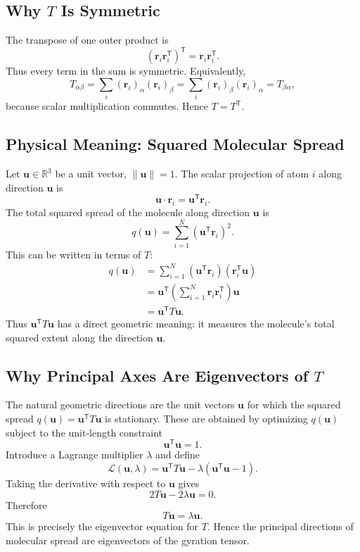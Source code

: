 \documentclass[11pt]{article}
\newcommand{\R}{\mathbb{R}}
\newcommand{\T}{\mathsf{T}}
\begin{document}
\subsection{Why \(T\) Is Symmetric}

The transpose of one outer product is
\[
    \left(\mathbf r_i\mathbf r_i^{\T}\right)^{\T}
    =
    \mathbf r_i\mathbf r_i^{\T}.
\]
Thus every term in the sum is symmetric.  Equivalently,
\[
    T_{\alpha\beta}
    =
    \sum_i(\mathbf r_i)_\alpha(\mathbf r_i)_\beta
    =
    \sum_i(\mathbf r_i)_\beta(\mathbf r_i)_\alpha
    =
    T_{\beta\alpha},
\]
because scalar multiplication commutes.  Hence \(T=T^{\T}\).

\subsection{Physical Meaning: Squared Molecular Spread}

Let \(\mathbf u\in\R^3\) be a unit vector, \(\lVert\mathbf u\rVert=1\).
The scalar projection of atom \(i\) along direction \(\mathbf u\) is
\[
    \mathbf u\cdot \mathbf r_i = \mathbf u^{\T}\mathbf r_i.
\]
The total squared spread of the molecule along direction \(\mathbf u\) is
\[
    q(\mathbf u)
    =
    \sum_{i=1}^{N}(\mathbf u^{\T}\mathbf r_i)^2.
\]
This can be written in terms of \(T\):
\[
\begin{aligned}
    q(\mathbf u)
    &=
    \sum_{i=1}^{N}
    (\mathbf u^{\T}\mathbf r_i)(\mathbf r_i^{\T}\mathbf u)\\
    &=
    \mathbf u^{\T}
    \left(\sum_{i=1}^{N}\mathbf r_i\mathbf r_i^{\T}\right)
    \mathbf u\\
    &=
    \mathbf u^{\T}T\mathbf u.
\end{aligned}
\]
Thus \(\mathbf u^{\T}T\mathbf u\) has a direct geometric meaning: it measures
the molecule's total squared extent along the direction \(\mathbf u\).

\subsection{Why Principal Axes Are Eigenvectors of \(T\)}

The natural geometric directions are the unit vectors \(\mathbf u\) for which
the squared spread \(q(\mathbf u)=\mathbf u^{\T}T\mathbf u\) is stationary.
These are obtained by optimizing \(q(\mathbf u)\) subject to the unit-length
constraint
\[
    \mathbf u^{\T}\mathbf u = 1.
\]
Introduce a Lagrange multiplier \(\lambda\) and define
\[
    \mathcal L(\mathbf u,\lambda)
    =
    \mathbf u^{\T}T\mathbf u
    -
    \lambda(\mathbf u^{\T}\mathbf u-1).
\]
Taking the derivative with respect to \(\mathbf u\) gives
\[
    2T\mathbf u - 2\lambda \mathbf u = 0.
\]
Therefore
\[
    T\mathbf u = \lambda \mathbf u.
\]
This is precisely the eigenvector equation for \(T\).  Hence the principal
directions of molecular spread are eigenvectors of the gyration tensor.
\end{document}
